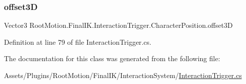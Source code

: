 \subsubsection{\texorpdfstring{offset3D}{offset3D}}
{\footnotesize\ttfamily Vector3 Root\+Motion.\+Final\+I\+K.\+Interaction\+Trigger.\+Character\+Position.\+offset3D\hspace{0.3cm}{\ttfamily [get]}}



Definition at line 79 of file Interaction\+Trigger.\+cs.



The documentation for this class was generated from the following file\+:\begin{DoxyCompactItemize}
\item 
Assets/\+Plugins/\+Root\+Motion/\+Final\+I\+K/\+Interaction\+System/\mbox{\hyperlink{_interaction_trigger_8cs}{Interaction\+Trigger.\+cs}}\end{DoxyCompactItemize}
